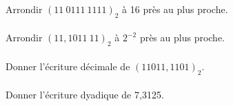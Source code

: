 \documentclass[a4paper,12pt,eval,firamath]{nsi}
\begin{document}
\maketitle


Arrondir $(11\ 0111\ 1111)_2$ à 16 près au plus proche.\\

\\


Arrondir $(11, 1011\ 11)_2$ à $2^{-2}$ près au plus proche.\\

\\

Donner l'écriture décimale de $(11011,1101)_2$.\\

\\

Donner l'écriture dyadique de 7,3125.\\

\end{document}
